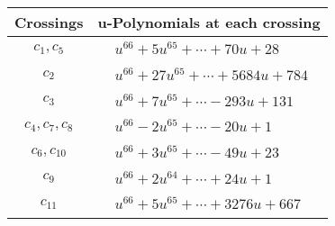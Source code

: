 \documentclass[1p]{elsarticle_modified}
\theoremstyle{definition}
\begin{document}
\begin{tabular}{m{50pt}|m{274pt}}
Crossings & \hspace{64pt}u-Polynomials at each crossing \\
\hline $$\begin{aligned}c_{1},c_{5}\end{aligned}$$&$\begin{aligned}
&u^{66}+5 u^{65}+\cdots+70 u+28
\end{aligned}$\\
\hline $$\begin{aligned}c_{2}\end{aligned}$$&$\begin{aligned}
&u^{66}+27 u^{65}+\cdots+5684 u+784
\end{aligned}$\\
\hline $$\begin{aligned}c_{3}\end{aligned}$$&$\begin{aligned}
&u^{66}+7 u^{65}+\cdots-293 u+131
\end{aligned}$\\
\hline $$\begin{aligned}c_{4},c_{7},c_{8}\end{aligned}$$&$\begin{aligned}
&u^{66}-2 u^{65}+\cdots-20 u+1
\end{aligned}$\\
\hline $$\begin{aligned}c_{6},c_{10}\end{aligned}$$&$\begin{aligned}
&u^{66}+3 u^{65}+\cdots-49 u+23
\end{aligned}$\\
\hline $$\begin{aligned}c_{9}\end{aligned}$$&$\begin{aligned}
&u^{66}+2 u^{64}+\cdots+24 u+1
\end{aligned}$\\
\hline $$\begin{aligned}c_{11}\end{aligned}$$&$\begin{aligned}
&u^{66}+5 u^{65}+\cdots+3276 u+667
\end{aligned}$\\
\hline
\end{tabular}\\~\\
\newpage\renewcommand{\arraystretch}{1}
\end{document}
